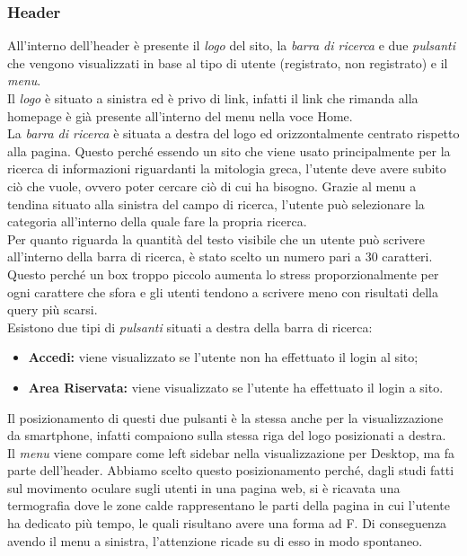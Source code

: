 \subsubsection{Header} \label{subsection:header}
All'interno dell'header è presente il \textit{logo} del sito, la \textit{barra di ricerca} e due \textit{pulsanti} che vengono visualizzati in base al tipo di utente (registrato, non registrato) e il \textit{menu}.\\
Il \textit{logo} è situato a sinistra ed è privo di link, infatti il link che rimanda alla homepage è già presente all'interno del menu nella voce Home.\\
La \textit{barra di ricerca} è situata a destra del logo ed orizzontalmente centrato rispetto alla pagina. Questo perché essendo un sito che viene usato principalmente per la ricerca di informazioni riguardanti la mitologia greca, l'utente deve avere subito ciò che vuole, ovvero poter cercare ciò di cui ha bisogno. Grazie al menu a tendina situato alla sinistra del campo di ricerca, l'utente può selezionare la categoria all'interno della quale fare la propria ricerca.\\
Per quanto riguarda la quantità del testo visibile che un utente può scrivere all'interno della barra di ricerca, è stato scelto un numero pari a 30 caratteri. Questo perché un box troppo piccolo aumenta lo stress proporzionalmente per ogni carattere che sfora e gli utenti tendono a scrivere meno con risultati della query più scarsi.\\
Esistono due tipi di \textit{pulsanti} situati a destra della barra di ricerca:
\begin{itemize}
	\item \textbf{Accedi:} viene visualizzato se l'utente non ha effettuato il login al sito;
	\item \textbf{Area Riservata:} viene visualizzato se l'utente ha effettuato il login a sito.
\end{itemize}
Il posizionamento di questi due pulsanti è la stessa anche per la visualizzazione da smartphone, infatti compaiono sulla stessa riga del logo posizionati a destra.\\
Il \textit{menu} viene compare come left sidebar nella visualizzazione per Desktop, ma fa parte dell'header. Abbiamo scelto questo posizionamento perché, dagli studi fatti sul movimento oculare sugli utenti in una pagina web, si è ricavata una termografia dove le zone calde rappresentano le parti della pagina in cui l'utente ha dedicato più tempo, le quali risultano avere una forma ad F. Di conseguenza avendo il menu a sinistra, l'attenzione ricade su di esso in modo spontaneo.\\
\pagebreak
